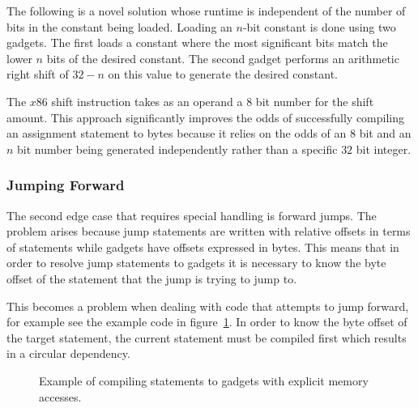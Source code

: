     The following is a novel solution whose runtime is independent of the number
    of bits in the constant being loaded. Loading an $n$-bit constant is done
    using two gadgets. The first loads a constant where the most significant
    bits match the lower $n$ bits of the desired constant. The second gadget
    performs an arithmetic right shift of $32-n$ on this value to generate the
    desired constant.

    The $x86$ shift instruction takes as an operand a $8$ bit number for the
    shift amount. This approach significantly improves the odds of successfully
    compiling an assignment statement to bytes because it relies on the odds of
    an $8$ bit and an $n$ bit number being generated independently rather than a
    specific $32$ bit integer.

    \subsubsection{Jumping Forward}

    The second edge case that requires special handling is forward jumps. The
    problem arises because jump statements are written with relative offsets in
    terms of statements while gadgets have offsets expressed in bytes. This
    means that in order to resolve jump statements to gadgets it is necessary to
    know the byte offset of the statement that the jump is trying to jump to.

    This becomes a problem when dealing with code that attempts to jump forward,
    for example see the example code in figure~\ref{fig:method-forward-jump}.
    In order to know the byte offset of the target statement, the current
    statement must be compiled first which results in a circular dependency.

    \begin{figure}
        \centering
        \caption{Example of compiling statements to gadgets with explicit memory
        accesses.}
        \label{fig:method-forward-jump}
    \end{figure}

